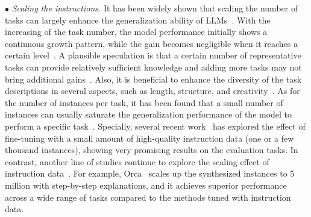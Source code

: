 $\bullet$ \emph{Scaling the instructions.} 
It has been widely shown that scaling the number of tasks can largely enhance the generalization ability of LLMs~\cite{Wei-ICLR-2022-Finetuned,Sanh-ICLR-2022-Multitask,Wang-EMNLP-2022-Super}. 
With the increasing of the task number, the model performance initially shows a continuous growth pattern, while the gain becomes negligible when it reaches a certain level~\cite{Wang-EMNLP-2022-Super,Chung-arxiv-2022-Scaling}. 
A plausible speculation is that a certain number of representative  tasks can provide relatively sufficient  knowledge and adding more tasks  may not bring additional gains~\cite{Chung-arxiv-2022-Scaling}.
Also,  it is  beneficial to enhance the diversity of the task descriptions in several aspects, such as length, structure, and creativity~\cite{Sanh-ICLR-2022-Multitask}.
As for the number of instances per task, it has been found that a small number of instances can usually saturate the generalization performance of the model to perform a specific task~\cite{Wei-ICLR-2022-Finetuned,Chung-arxiv-2022-Scaling}.
{Specially, several recent work~\cite{zhou-arxiv-2023-lima,Chen-arxiv-2023-AlpaGasus} has explored the effect of fine-tuning with a small amount of high-quality instruction data (\eg one or a few thousand instances),  showing very promising results on the evaluation tasks.  
In contrast, another line of studies continue to explore the scaling effect of instruction data~\cite{Mukherjee-arxiv-2023-Orca,YuLan-Chat}. For example, Orca~\cite{Mukherjee-arxiv-2023-Orca} scales up the synthesized instances to 5 million with step-by-step explanations, and it achieves superior performance across a wide range of tasks compared to the methods tuned with instruction  data.}





